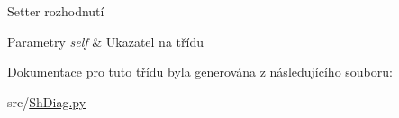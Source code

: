 Setter rozhodnutí 


\begin{DoxyParams}{Parametry}
{\em self} & Ukazatel na třídu \\
\hline
\end{DoxyParams}


Dokumentace pro tuto třídu byla generována z následujícího souboru\-:\begin{DoxyCompactItemize}
\item 
src/\hyperlink{ShDiag_8py}{Sh\-Diag.\-py}\end{DoxyCompactItemize}
